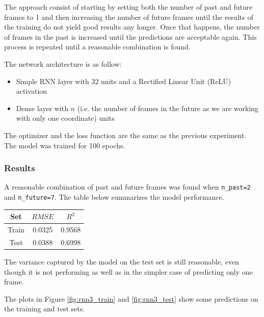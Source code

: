 \documentclass[a4paper]{article}
\begin{document}
  The approach consist of starting by setting both the number of past and future frames to 1 and then increasing the number of future frames until the results of the training do not yield good results any longer. Once that happens, the number of frames in the past is increased until the predictions are acceptable again. This process is repeated until a reasonable combination is found.

  The network architecture is as follow:

  \begin{itemize}
    \item Simple RNN layer with 32 units and a Rectified Linear Unit (ReLU) activation
    \item Dense layer with $n$ (i.e. the number of frames in the future as we are working with only one coordinate) units
  \end{itemize}

  The optimizer and the loss function are the same as the previous experiment. The model was trained for 100 epochs.

  \subsubsection{Results}
  A reasonable combination of past and future frames was found when \texttt{n\_past=2} and \texttt{n\_future=7}. The table below summarizes the model performance.

  \begin{table}[h!]
    \centering
    \begin{tabular}{|c | c c|} 
     \hline
     Set & $RMSE$ & $R^2$ \\ [0.5ex] 
     \hline\hline
     Train & 0.0325 & 0.9568 \\ 
     Test & 0.0388 & 0.6998 \\
     \hline
    \end{tabular}
  \end{table}

  The variance captured by the model on the test set is still reasonable, even though it is not performing as well as in the simpler case of predicting only one frame.

  The plots in Figure \ref{fig:rnn3_train} and \ref{fig:rnn3_test} show some predictions on the training and test sets.
\end{document}

